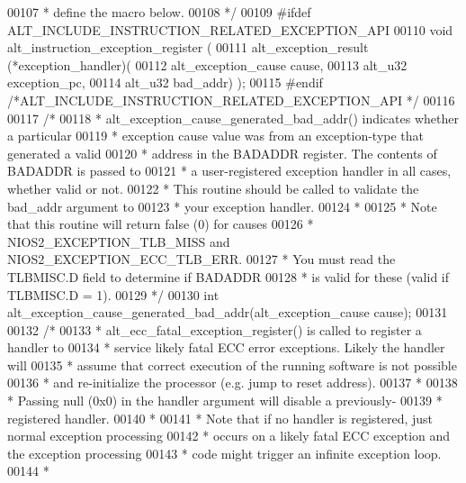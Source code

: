 \begin{DoxyCode}
00107 \textcolor{comment}{ * define the macro below.}
00108 \textcolor{comment}{ */}
00109 \textcolor{preprocessor}{#ifdef ALT\_INCLUDE\_INSTRUCTION\_RELATED\_EXCEPTION\_API}
00110 \textcolor{keywordtype}{void} alt\_instruction\_exception\_register (
00111   alt\_exception\_result (*exception\_handler)(
00112     alt\_exception\_cause cause,
00113     alt_u32 exception\_pc,
00114     alt_u32 bad\_addr) );
00115 \textcolor{preprocessor}{#endif }\textcolor{comment}{/*ALT\_INCLUDE\_INSTRUCTION\_RELATED\_EXCEPTION\_API */}\textcolor{preprocessor}{}
00116 
00117 \textcolor{comment}{/*}
00118 \textcolor{comment}{ * alt\_exception\_cause\_generated\_bad\_addr() indicates whether a particular}
00119 \textcolor{comment}{ * exception cause value was from an exception-type that generated a valid}
00120 \textcolor{comment}{ * address in the BADADDR register. The contents of BADADDR is passed to}
00121 \textcolor{comment}{ * a user-registered exception handler in all cases, whether valid or not.}
00122 \textcolor{comment}{ * This routine should be called to validate the bad\_addr argument to}
00123 \textcolor{comment}{ * your exception handler.}
00124 \textcolor{comment}{ *}
00125 \textcolor{comment}{ * Note that this routine will return false (0) for causes }
00126 \textcolor{comment}{ * NIOS2\_EXCEPTION\_TLB\_MISS and NIOS2\_EXCEPTION\_ECC\_TLB\_ERR.}
00127 \textcolor{comment}{ * You must read the TLBMISC.D field to determine if BADADDR}
00128 \textcolor{comment}{ * is valid for these (valid if TLBMISC.D = 1).}
00129 \textcolor{comment}{ */}
00130 \textcolor{keywordtype}{int} alt_exception_cause_generated_bad_addr(alt\_exception\_cause cause);
00131 
00132 \textcolor{comment}{/*}
00133 \textcolor{comment}{ * alt\_ecc\_fatal\_exception\_register() is called to register a handler to}
00134 \textcolor{comment}{ * service likely fatal ECC error exceptions. Likely the handler will}
00135 \textcolor{comment}{ * assume that correct execution of the running software is not possible}
00136 \textcolor{comment}{ * and re-initialize the processor (e.g. jump to reset address).}
00137 \textcolor{comment}{ * }
00138 \textcolor{comment}{ * Passing null (0x0) in the handler argument will disable a previously-}
00139 \textcolor{comment}{ * registered handler.}
00140 \textcolor{comment}{ *}
00141 \textcolor{comment}{ * Note that if no handler is registered, just normal exception processing}
00142 \textcolor{comment}{ * occurs on a likely fatal ECC exception and the exception processing}
00143 \textcolor{comment}{ * code might trigger an infinite exception loop.}
00144 \textcolor{comment}{ *}

\end{DoxyCode}
